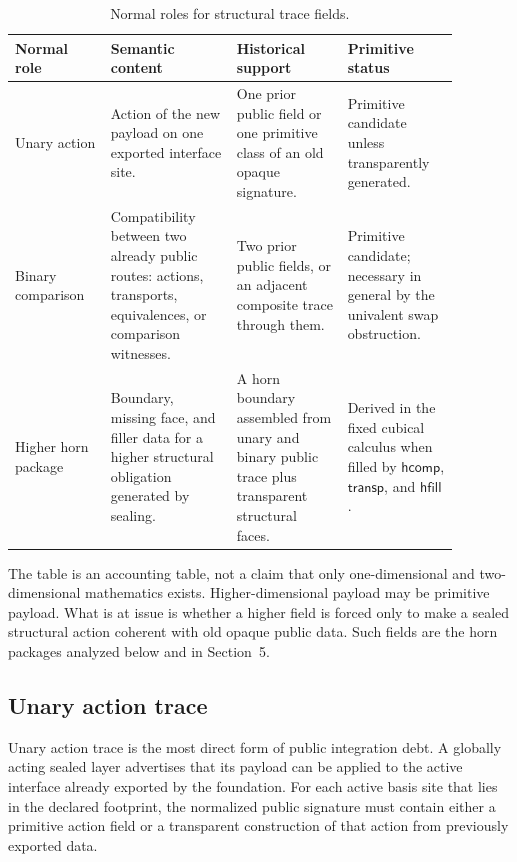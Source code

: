 \documentclass{lmcs}
\begin{document}
\begin{table}[t]
\centering
\small
\setlength{\tabcolsep}{3pt}
\begin{tabular}{p{0.19\linewidth}p{0.25\linewidth}p{0.22\linewidth}p{0.22\linewidth}}
\hline
Normal role & Semantic content & Historical support & Primitive status \\
\hline
Unary action &
Action of the new payload on one exported interface site. &
One prior public field or one primitive class of an old opaque signature. &
Primitive candidate unless transparently generated. \\
\hline
Binary comparison &
Compatibility between two already public routes: actions, transports, equivalences, or
comparison witnesses. &
Two prior public fields, or an adjacent composite trace through them. &
Primitive candidate; necessary in general by the univalent swap obstruction. \\
\hline
Higher horn package &
Boundary, missing face, and filler data for a higher structural obligation generated by
sealing. &
A horn boundary assembled from unary and binary public trace plus transparent structural
faces. &
Derived in the fixed cubical calculus when filled by \(\mathsf{hcomp}\), \(\mathsf{transp}\),
and \(\mathsf{hfill}\). \\
\hline
\end{tabular}
\caption{Normal roles for structural trace fields.}
\end{table}

The table is an accounting table, not a claim that only one-dimensional and two-dimensional
mathematics exists.  Higher-dimensional payload may be primitive payload.  What is at issue
is whether a higher field is forced only to make a sealed structural action coherent with old
opaque public data.  Such fields are the horn packages analyzed below and in Section~5.

\subsection{Unary action trace}

Unary action trace is the most direct form of public integration debt.  A globally acting
sealed layer advertises that its payload can be applied to the active interface already
exported by the foundation.  For each active basis site that lies in the declared footprint,
the normalized public signature must contain either a primitive action field or a transparent
construction of that action from previously exported data.
\end{document}
